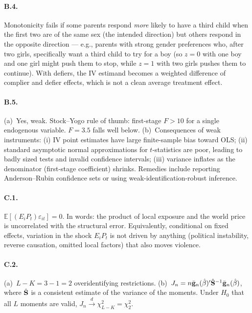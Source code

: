 \documentclass{article}
\newcommand{\E}{\mathbb{E}}
\newcommand{\dconv}{\xrightarrow{d}}
\begin{document}
\paragraph{B.4.}  Monotonicity fails if some parents respond \emph{more} likely to have a third child when the first two are of the same sex (the intended direction) but others respond in the opposite direction --- e.g., parents with strong gender preferences who, after two girls, specifically want a third child to try for a boy (so $z = 0$ with one boy and one girl might push them to stop, while $z = 1$ with two girls pushes them to continue).  With defiers, the IV estimand becomes a weighted difference of complier and defier effects, which is not a clean average treatment effect.

\paragraph{B.5.}  (a)~Yes, weak.  Stock--Yogo rule of thumb: first-stage $F > 10$ for a single endogenous variable.  $F = 3.5$ falls well below.  (b)~Consequences of weak instruments: (i) IV point estimates have large finite-sample bias toward OLS; (ii) standard asymptotic normal approximations for $t$-statistics are poor, leading to badly sized tests and invalid confidence intervals; (iii) variance inflates as the denominator (first-stage coefficient) shrinks.  Remedies include reporting Anderson--Rubin confidence sets or using weak-identification-robust inference.

\bigskip

\paragraph{C.1.}  $\E[(E_i P_t)\varepsilon_{it}] = 0$.  In words: the product of local exposure and the world price is uncorrelated with the structural error.  Equivalently, conditional on fixed effects, variation in the shock $E_i P_t$ is not driven by anything (political instability, reverse causation, omitted local factors) that also moves violence.

\paragraph{C.2.}  (a)~$L - K = 3 - 1 = 2$ overidentifying restrictions.  (b)~$J_n = n\bar{{\mathbf g}}_n(\hat\beta)'\hat{{\mathbf S}}^{-1}\bar{{\mathbf g}}_n(\hat\beta)$, where $\hat{{\mathbf S}}$ is a consistent estimate of the variance of the moments.  Under $H_0$ that all $L$ moments are valid, $J_n \dconv \chi^2_{L - K} = \chi^2_2$.
\end{document}
